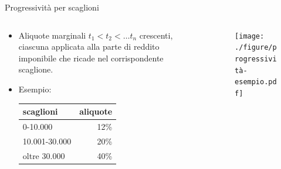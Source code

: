 \documentclass[aspectratio=64,11pt]{beamer}
\newcommand\€{\,\text{€}}
\begin{document}
\begin{frame}{Progressività per scaglioni}
\begin{columns}
\begin{column}{.4\columnwidth}
\small
\begin{itemize}
\item Aliquote marginali $t_1<t_2<\dots t_n$ crescenti, ciascuna applicata alla
parte di reddito imponibile che ricade nel corrispondente scaglione.
\item Esempio:
  \begin{tabular}{lr}
\toprule scaglioni & aliquote \\ \midrule 
0-10.000 & 12\% \\ 
  10.001-30.000 & 20\% \\ 
  oltre 30.000 & 40\% \\
  \bottomrule
\end{tabular}
\end{itemize}
\end{column}

\begin{column}{.6\columnwidth}
\begin{figure}
\centering
\texttt{[image: ./figure/progressività-esempio.pdf]}
\end{figure}
\end{column}
\end{columns}
\end{frame}
\end{document}
